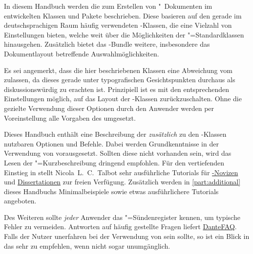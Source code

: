 \addchap[tocentry={}]{\prefacename}

In diesem Handbuch werden die zum Erstellen von "~Dokumenten 
im \href{https://tu-dresden.de/cd}{\TUDCD} entwickelten Klassen und Pakete 
beschrieben. Diese basieren auf den gerade im deutschsprachigen Raum häufig 
verwendeten \KOMAScript-Klassen, die eine Vielzahl von Einstellungen bieten, 
welche weit über die Möglichkeiten der "=Standardklassen 
hinausgehen. Zusätzlich bietet das \TUDScript-Bundle weitere, insbesondere das 
Dokumentlayout betreffende Auswahlmöglichkeiten.

Es sei angemerkt, dass die hier beschriebenen Klassen eine Abweichung vom 
\TUDCD zulassen, da dieses gerade unter typografischen Gesichtspunkten 
durchaus als diskussionswürdig zu erachten ist. Prinzipiell ist es mit den 
entsprechenden Einstellungen möglich, auf das Layout der \KOMAScript-Klassen 
zurückzuschalten. Ohne die gezielte Verwendung dieser Optionen durch den 
Anwender werden per Voreinstellung alle Vorgaben des \CDs umgesetzt.

Dieses Handbuch enthält eine Beschreibung der \emph{zusätzlich} zu den 
\KOMAScript-Klassen nutzbaren Optionen und Befehle. Dabei werden 
Grundkenntnisse in der Verwendung von  vorausgesetzt. Sollten 
diese nicht vorhanden sein, wird das Lesen der "=Kurzbeschreibung
\href{http://mirrors.ctan.org/info/lshort/german/l2kurz.pdf}{}
dringend empfohlen. Für den vertiefenden Einstieg in  stellt 
Nicola~L.~C.~Talbot sehr ausführliche Tutorials für 
\href{http://www.dickimaw-books.com/latex/novices/}{-Novizen} 
und \href{http://www.dickimaw-books.com/latex/thesis/}{Dissertationen} zur 
freien Verfügung. Zusätzlich werden in \autoref{part:additional} dieses 
Handbuchs Minimalbeispiele sowie etwas ausführlichere Tutorials angeboten.

Des Weiteren sollte \emph{jeder} Anwender das "=Sündenregister 
kennen, um typische Fehler zu vermeiden. Antworten auf häufig gestellte Fragen 
liefert \href{http://projekte.dante.de/DanteFAQ/WebHome}{DanteFAQ}. Falls der 
Nutzer unerfahren bei der Verwendung von \KOMAScript sein sollte, so ist ein 
Blick in das  sehr zu empfehlen, wenn nicht 
sogar unumgänglich.

